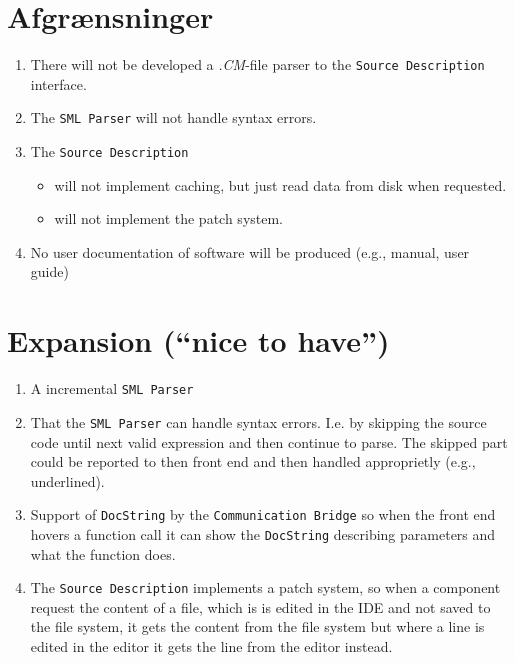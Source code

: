 \documentclass[a4paper,oneside]{memoir}
\begin{document}
\section{Afgrænsninger}

\begin{enumerate}
\item There will not be developed a \textit{.CM}-file parser to the
  \texttt{Source Description} interface.

\item The \texttt{SML Parser} will not handle syntax errors. 

\item The \texttt{Source Description} 

  \begin{itemize}
  \item will not implement caching, but just read data from disk when requested.

  \item will not implement the patch system.
  \end{itemize}

\item No user documentation of software will be produced (e.g., manual, user guide)
\end{enumerate}


\section{Expansion (``nice to have'')}


\begin{enumerate}
\item A incremental \texttt{SML Parser}

\item That the \texttt{SML Parser} can handle syntax errors. I.e. by skipping
  the source code until next valid expression and then continue to parse. The
  skipped part could be reported to then front end and then handled approprietly
  (e.g., underlined).

\item Support of \texttt{DocString} by the \texttt{Communication Bridge} so when
  the front end hovers a function call it can show the \texttt{DocString}
  describing parameters and what the function does.

\item The \texttt{Source Description} implements a patch system, so when a
  component request the content of  a file, which is is edited in the IDE and
  not saved to the file system, it gets the content from the file system but
  where a line is edited in the editor it gets the line from the editor instead.
\end{enumerate}
\end{document}
